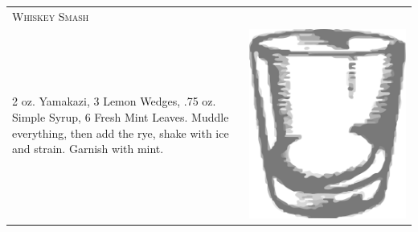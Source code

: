 \documentclass{article}
\begin{document}
\begin{tabular}{p{2in} p{0.5in}}
  \multicolumn{2}{p{3in}}{\centering\Huge\textsc{Whiskey Smash}} \\ 
  
   \vspace{-0.1in}2 oz. Yamakazi, 3 Lemon Wedges, .75 oz.  Simple Syrup, 6
    Fresh Mint Leaves. Muddle everything, then add the rye, shake with
    ice and strain. Garnish with mint. &
   \vspace{-0.1in} \includegraphics{rocks_glass.png}
\end{tabular}
\end{document}
